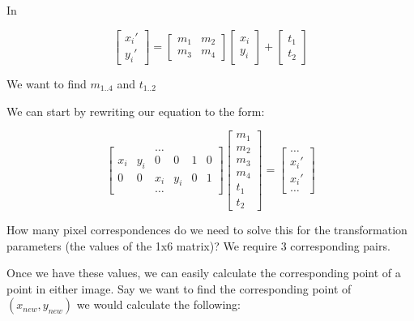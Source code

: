 \documentclass{article}
\begin{document}
In

\[
  \begin{bmatrix}
    x_{i }' \\ y_{i}'
  \end{bmatrix}
  = \begin{bmatrix}
    m_{1} & m_{2} \\
    m_{3} & m_{4}
  \end{bmatrix}\begin{bmatrix}
    x_{i}\\
    y_{i}
  \end{bmatrix} + \begin{bmatrix}
    t_{1} \\ t_{2}
  \end{bmatrix}
\]

We want to find $m_{1..4}$ and $t_{1..2}$

We can start by rewriting our equation to the form:

\[
  \begin{bmatrix}
    & & \ldots & & & \\
    x_{i} & y_{i} & 0 & 0 & 1 & 0 \\
    0 & 0 & x_{i} & y_{i} & 0 & 1 \\
     & & \ldots & & &
   \end{bmatrix}
   \begin{bmatrix}
     m_{1} \\ m_{2} \\ m_{3} \\ m_{4} \\ t_{1} \\ t_{2}
   \end{bmatrix}=
   \begin{bmatrix}
     \ldots \\ x_{i}' \\ x_{i}' \\ \ldots
   \end{bmatrix}
 \]

 How many pixel correspondences do we need to solve this for the transformation parameters (the values of the 1x6 matrix)? We require 3 corresponding pairs.

 Once we have these values, we can easily calculate the corresponding point of a point in either image. Say we want to find the corresponding point of $(x_{new},y_{new})$ we would calculate the following:
\end{document}
